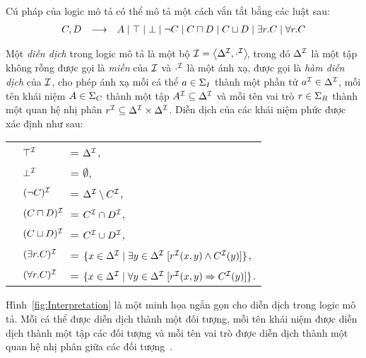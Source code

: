 \noindent
Cú pháp của logic mô tả \ALC có thể mô tả một cách vắn tắt bằng các luật sau:
\[
	\begin{array}{r c l}
		C, D & \longrightarrow&
		A \mid
		\top \mid
		\bot \mid
		\neg C \mid
		C\sqcap D \mid
		C \sqcup D \mid
		\exists r.C \mid
		\forall r.C
	\end{array}
\]

\begin{Definition}
Một {\em diễn dịch} trong logic mô tả \ALC là một bộ \mbox{$\mathcal{I} = \left\langle\Delta^{\mathcal{I}}, \cdot^{\mathcal{I}}\right\rangle\!$}, trong đó $\Delta^{\mathcal{I}}$ là một tập không rỗng được gọi là {\em miền} của $\mathcal{I}$ và $\cdot^{\mathcal{I}}$ là một ánh xạ, được gọi là {\em hàm diễn dịch} của $\mathcal{I}$, cho phép ánh xạ mỗi cá thể $a \in \Sigma_I$ thành một phần tử $a^{\mathcal{I}} \in \Delta^{\mathcal{I}}$, mỗi tên khái niệm $A \in \Sigma_C$ thành một tập $A^{\mathcal{I}} \subseteq \Delta^{\mathcal{I}}$ và mỗi tên vai trò $r \in \Sigma_R$ thành một quan hệ nhị phân $r^{\mathcal{I}} \subseteq \Delta^{\mathcal{I}} \times \Delta^{\mathcal{I}}$.
Diễn dịch của các khái niệm phức được xác định như sau:\\[1.5ex]
\begin{tabular}{c l l}
	& $\top^{\mathcal{I}}$             & = $\Delta^{\mathcal{I}}$, \\[0.5ex]
	& $\bot^{\mathcal{I}}$             & = $\emptyset$, \\[0.5ex]
	& $(\neg C)^{\mathcal{I}}$         & = $\Delta^{\mathcal{I}} \setminus C^{\mathcal{I}}$, \\[0.5ex]
	& $(C \sqcap D)^{\mathcal{I}}\!\!\!$& = $C^{\mathcal{I}} \cap D^{\mathcal{I}}$, \\[0.5ex]
	& $(C \sqcup D)^{\mathcal{I}}\!\!\!\!\!$ & = $C^{\mathcal{I}} \cup D^{\mathcal{I}}$, \\[0.5ex]
	& $(\exists r.C)^{\mathcal{I}}$         & = $\{x \in \Delta^{\mathcal{I}} \mid \exists y\in \Delta^{\mathcal{I}}\; [r^{\mathcal{I}}(x,y) \wedge C^{\mathcal{I}}(y)]\}$, \\[0.7ex]
	& $(\forall r.C)^{\mathcal{I}}$         & = $\{ x \in \Delta^{\mathcal{I}} \mid \forall y \in \Delta^{\mathcal{I}}\; [r^{\mathcal{I}}(x,y) \Rightarrow C^{\mathcal{I}}(y)]\}$.\hspace{5.15cm}\myend
\end{tabular}
\end{Definition}

Hình~\ref{fig:Interpretation} là một minh họa ngắn gọn cho diễn dịch trong logic mô tả. Mỗi cá thể được diễn dịch thành một đối tượng, mỗi tên khái niệm được diễn dịch thành một tập các đối tượng và mỗi tên vai trò được diễn dịch thành một quan hệ nhị phân giữa các đối tượng~\cite{Rouene2013}.

